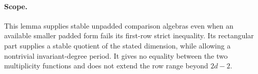 \paragraph{Scope.}
This lemma supplies stable unpadded comparison algebras even
when an available smaller padded form fails its first-row
strict inequality. Its rectangular part supplies a stable
quotient of the stated dimension, while allowing a nontrivial
invariant-degree period. It gives no equality between the two
multiplicity functions and does not extend the row range
beyond $2d-2$.
